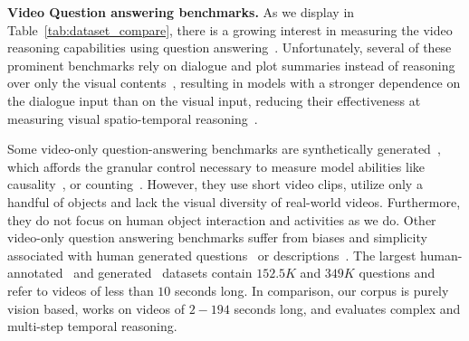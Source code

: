 \noindent\textbf{Video Question answering benchmarks.}
As we display in Table~\ref{tab:dataset_compare}, there is a growing interest in measuring the video reasoning capabilities using question answering~\cite{tapaswi2016movieqa,lei2018tvqa,jang2017tgif,kim2017deepstory,xu2017video,maharaj2017dataset,zeng2016leveraging,yu2019activitynet,yi2019clevrer}. Unfortunately, several of these prominent benchmarks rely on dialogue and plot summaries instead of reasoning over only the visual contents~\cite{lei2018tvqa,tapaswi2016movieqa,kim2017deepstory,zadeh2019social}, resulting in models with a stronger dependence on the dialogue input than on the visual input, reducing their effectiveness at measuring visual spatio-temporal reasoning~\cite{tapaswi2016movieqa,lei2018tvqa}.

Some video-only question-answering benchmarks are synthetically generated~\cite{yi2019clevrer, mun2017marioqa}, which affords the granular control necessary to measure model abilities like causality~\cite{yi2019clevrer}, or counting~\cite{mun2017marioqa}. However, they use short video clips, utilize only a handful of objects and lack the visual diversity of real-world videos. Furthermore, they do not focus on human object interaction and activities as we do. Other video-only question answering benchmarks suffer from biases and simplicity associated with human generated questions~\cite{yu2019activitynet,tapaswi2016movieqa,jang2017tgif,lei2018tvqa} or descriptions~\cite{xu2017video,zeng2016leveraging}. The largest human-annotated~\cite{lei2018tvqa} and generated~\cite{maharaj2017dataset} datasets contain $152.5K$ and $349K$ questions and refer to videos of less than $10$ seconds long. In comparison, our corpus is purely vision based, works on videos of $2-194$ seconds long, and evaluates complex and multi-step temporal reasoning.




